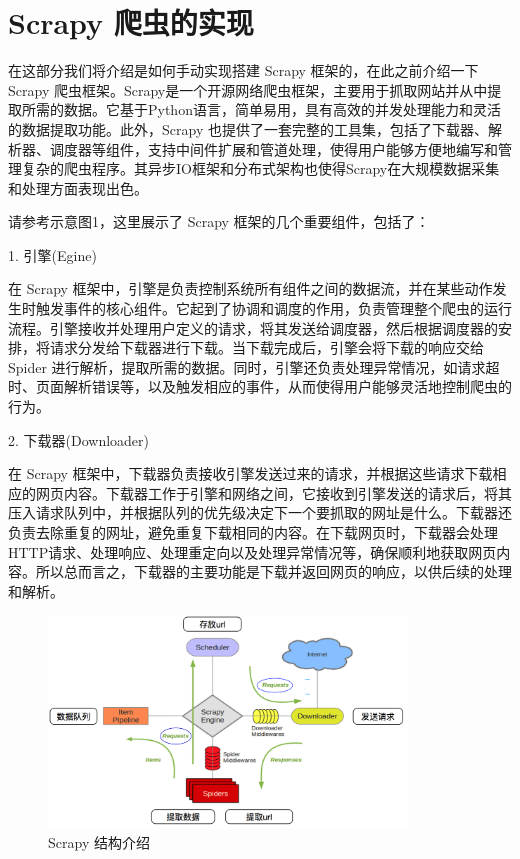 \documentclass[12pt,hyperref,a4paper,UTF8]{ctexart}
\begin{document}
\newpage
\section{Scrapy 爬虫的实现}

在这部分我们将介绍是如何手动实现搭建 Scrapy 框架的，在此之前介绍一下 Scrapy 爬虫框架。Scrapy是一个开源网络爬虫框架，主要用于抓取网站并从中提取所需的数据。它基于Python语言，简单易用，具有高效的并发处理能力和灵活的数据提取功能。此外，Scrapy 也提供了一套完整的工具集，包括了下载器、解析器、调度器等组件，支持中间件扩展和管道处理，使得用户能够方便地编写和管理复杂的爬虫程序。其异步IO框架和分布式架构也使得Scrapy在大规模数据采集和处理方面表现出色。

请参考示意图1，这里展示了 Scrapy 框架的几个重要组件，包括了：

1. 引擎(Egine)

在 Scrapy 框架中，引擎是负责控制系统所有组件之间的数据流，并在某些动作发生时触发事件的核心组件。它起到了协调和调度的作用，负责管理整个爬虫的运行流程。引擎接收并处理用户定义的请求，将其发送给调度器，然后根据调度器的安排，将请求分发给下载器进行下载。当下载完成后，引擎会将下载的响应交给 Spider 进行解析，提取所需的数据。同时，引擎还负责处理异常情况，如请求超时、页面解析错误等，以及触发相应的事件，从而使得用户能够灵活地控制爬虫的行为。

2. 下载器(Downloader)

在 Scrapy 框架中，下载器负责接收引擎发送过来的请求，并根据这些请求下载相应的网页内容。下载器工作于引擎和网络之间，它接收到引擎发送的请求后，将其压入请求队列中，并根据队列的优先级决定下一个要抓取的网址是什么。下载器还负责去除重复的网址，避免重复下载相同的内容。在下载网页时，下载器会处理HTTP请求、处理响应、处理重定向以及处理异常情况等，确保顺利地获取网页内容。所以总而言之，下载器的主要功能是下载并返回网页的响应，以供后续的处理和解析。

\begin{figure}[H]
\centering
\includegraphics[width=0.85\textwidth]{figures/scrapy_introduction.png}
\caption{Scrapy 结构介绍} 
\end{figure}
\end{document}
